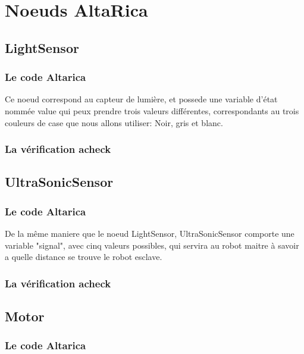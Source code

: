  \section{Noeuds AltaRica}
 
  \subsection{LightSensor}

  \subsubsection{Le code Altarica}
  


  Ce noeud correspond au capteur de lumière, et possede une variable d'état nommée value qui peux prendre trois valeurs différentes, correspondants au trois couleurs de case que nous allons utiliser: Noir, gris et blanc.
  
  \subsubsection{La vérification acheck}

  \subsection{UltraSonicSensor}
  \subsubsection{Le code Altarica}
  
  


  De la même maniere que le noeud LightSensor, UltraSonicSensor comporte une variable "signal", avec cinq valeurs possibles, qui servira au robot maitre à savoir a quelle distance se trouve le robot esclave.

  \subsubsection{La vérification acheck}
  

  \subsection{Motor}
  \subsubsection{Le code Altarica}
  



